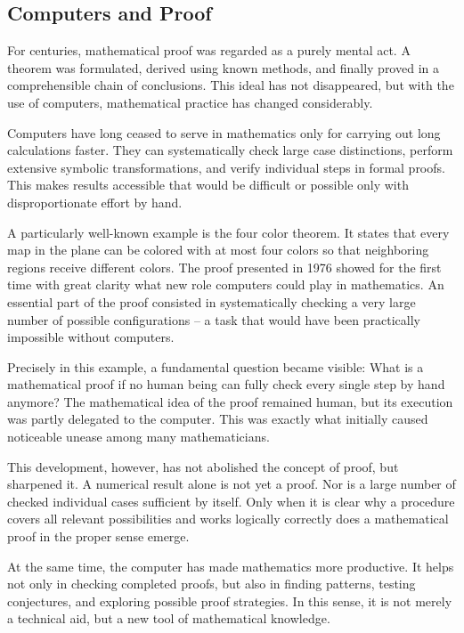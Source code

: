 
\subsection{Computers and Proof}

For centuries, mathematical proof was regarded as a purely mental act.
A theorem was formulated,
derived using known methods,
and finally proved in a comprehensible chain of conclusions.
This ideal has not disappeared,
but with the use of computers,
mathematical practice has changed considerably.

Computers have long ceased to serve in mathematics only for carrying out long calculations faster.
They can systematically check large case distinctions,
perform extensive symbolic transformations,
and verify individual steps in formal proofs.
This makes results accessible
that would be difficult or possible only with disproportionate effort by hand.

A particularly well-known example is the four color theorem.
It states that every map in the plane
can be colored with at most four colors
so that neighboring regions receive different colors.
The proof presented in 1976 showed for the first time with great clarity
what new role computers could play in mathematics.
An essential part of the proof consisted in systematically checking
a very large number of possible configurations --
a task that would have been practically impossible without computers.

Precisely in this example,
a fundamental question became visible:
What is a mathematical proof
if no human being can fully check every single step by hand anymore?
The mathematical idea of the proof remained human,
but its execution was partly delegated to the computer.
This was exactly what initially caused noticeable unease
among many mathematicians.

This development, however, has not abolished the concept of proof,
but sharpened it.
A numerical result alone is not yet a proof.
Nor is a large number of checked individual cases sufficient by itself.
Only when it is clear
why a procedure covers all relevant possibilities
and works logically correctly
does a mathematical proof in the proper sense emerge.

At the same time, the computer has made mathematics more productive.
It helps not only in checking completed proofs,
but also in finding patterns,
testing conjectures,
and exploring possible proof strategies.
In this sense, it is not merely a technical aid,
but a new tool of mathematical knowledge.

